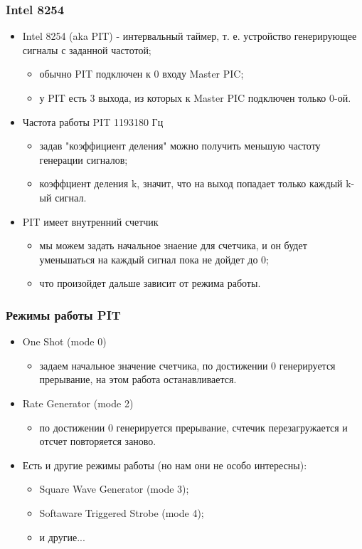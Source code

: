 \begin{frame}
\frametitle{Intel 8254}
\begin{itemize}
  \item Intel 8254 (aka PIT) - интервальный таймер, т. е. устройство
  генерирующее сигналы с заданной частотой;
  \begin{itemize}
    \item обычно PIT подключен к 0 входу Master PIC;
    \item у PIT есть 3 выхода, из которых к Master PIC подключен только 0-ой.
  \end{itemize}
  \item Частота работы PIT 1193180 Гц
  \begin{itemize}
    \item задав "коэффициент деления" можно получить меньшую частоту генерации
    сигналов;
    \item коэффциент деления k, значит, что на выход попадает только каждый k-ый
    сигнал.
  \end{itemize}
  \item PIT имеет внутренний счетчик
  \begin{itemize}
    \item мы можем задать начальное знаение для счетчика, и он будет уменьшаться
    на каждый сигнал пока не дойдет до 0;
    \item что произойдет дальше зависит от режима работы.
  \end{itemize}
\end{itemize}
\end{frame}

\begin{frame}
\frametitle{Режимы работы PIT}
\begin{itemize}
  \item One Shot (mode 0)
  \begin{itemize}
    \item задаем начальное значение счетчика, по достижении 0 генерируется
    прерывание, на этом работа останавливается.
  \end{itemize}
  \item Rate Generator (mode 2)
  \begin{itemize}
    \item по достижении 0 генерируется прерывание, счтечик перезагружается и
    отсчет повторяется заново.
  \end{itemize}
  \item Есть и другие режимы работы (но нам они не особо интересны):
  \begin{itemize}
    \item Square Wave Generator (mode 3);
    \item Softaware Triggered Strobe (mode 4);
    \item и другие...
  \end{itemize}
\end{itemize}
\end{frame}

